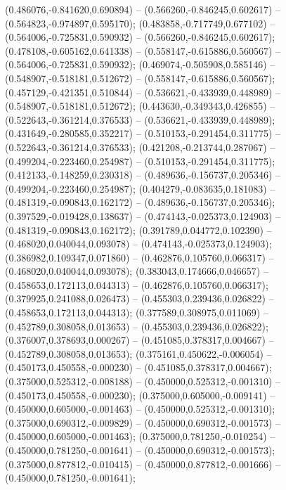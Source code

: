  (0.486076,-0.841620,0.690894) -- (0.566260,-0.846245,0.602617) -- (0.564823,-0.974897,0.595170);
 (0.483858,-0.717749,0.677102) -- (0.564006,-0.725831,0.590932) -- (0.566260,-0.846245,0.602617);
 (0.478108,-0.605162,0.641338) -- (0.558147,-0.615886,0.560567) -- (0.564006,-0.725831,0.590932);
 (0.469074,-0.505908,0.585146) -- (0.548907,-0.518181,0.512672) -- (0.558147,-0.615886,0.560567);
 (0.457129,-0.421351,0.510844) -- (0.536621,-0.433939,0.448989) -- (0.548907,-0.518181,0.512672);
 (0.443630,-0.349343,0.426855) -- (0.522643,-0.361214,0.376533) -- (0.536621,-0.433939,0.448989);
 (0.431649,-0.280585,0.352217) -- (0.510153,-0.291454,0.311775) -- (0.522643,-0.361214,0.376533);
 (0.421208,-0.213744,0.287067) -- (0.499204,-0.223460,0.254987) -- (0.510153,-0.291454,0.311775);
 (0.412133,-0.148259,0.230318) -- (0.489636,-0.156737,0.205346) -- (0.499204,-0.223460,0.254987);
 (0.404279,-0.083635,0.181083) -- (0.481319,-0.090843,0.162172) -- (0.489636,-0.156737,0.205346);
 (0.397529,-0.019428,0.138637) -- (0.474143,-0.025373,0.124903) -- (0.481319,-0.090843,0.162172);
 (0.391789,0.044772,0.102390) -- (0.468020,0.040044,0.093078) -- (0.474143,-0.025373,0.124903);
 (0.386982,0.109347,0.071860) -- (0.462876,0.105760,0.066317) -- (0.468020,0.040044,0.093078);
 (0.383043,0.174666,0.046657) -- (0.458653,0.172113,0.044313) -- (0.462876,0.105760,0.066317);
 (0.379925,0.241088,0.026473) -- (0.455303,0.239436,0.026822) -- (0.458653,0.172113,0.044313);
 (0.377589,0.308975,0.011069) -- (0.452789,0.308058,0.013653) -- (0.455303,0.239436,0.026822);
 (0.376007,0.378693,0.000267) -- (0.451085,0.378317,0.004667) -- (0.452789,0.308058,0.013653);
 (0.375161,0.450622,-0.006054) -- (0.450173,0.450558,-0.000230) -- (0.451085,0.378317,0.004667);
 (0.375000,0.525312,-0.008188) -- (0.450000,0.525312,-0.001310) -- (0.450173,0.450558,-0.000230);
 (0.375000,0.605000,-0.009141) -- (0.450000,0.605000,-0.001463) -- (0.450000,0.525312,-0.001310);
 (0.375000,0.690312,-0.009829) -- (0.450000,0.690312,-0.001573) -- (0.450000,0.605000,-0.001463);
 (0.375000,0.781250,-0.010254) -- (0.450000,0.781250,-0.001641) -- (0.450000,0.690312,-0.001573);
 (0.375000,0.877812,-0.010415) -- (0.450000,0.877812,-0.001666) -- (0.450000,0.781250,-0.001641);
